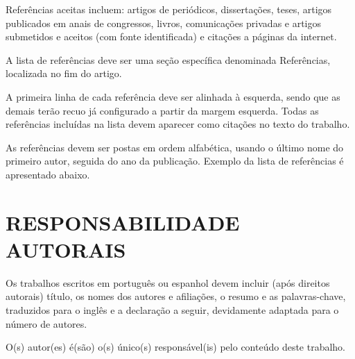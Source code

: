 \documentclass[10pt,fleqn,a4paper,twoside]{article}
\begin{document}
    
        Referências aceitas incluem: artigos de periódicos, dissertações, teses, artigos publicados em anais de congressos, livros, comunicações privadas e artigos submetidos e aceitos (com fonte identificada) e citações a páginas da internet.

        A lista de referências deve ser uma seção específica denominada Referências, localizada no fim do artigo.

        A primeira linha de cada referência deve ser alinhada à esquerda, sendo que as demais terão recuo já configurado a partir da margem esquerda. Todas as referências incluídas na lista devem aparecer como citações no texto do trabalho.

        As referências devem ser postas em ordem alfabética, usando o último nome do primeiro autor, seguida do ano da publicação. Exemplo da lista de referências é apresentado abaixo.
        
        
        

    \section{RESPONSABILIDADE AUTORAIS}

        Os trabalhos escritos em português ou espanhol devem incluir (após direitos autorais) título, os nomes dos autores e afiliações, o resumo e as palavras-chave, traduzidos para o inglês e a declaração a seguir, devidamente adaptada para o número de autores.
    
        O(s) autor(es) é(são) o(s) único(s) responsável(is) pelo conteúdo deste trabalho.

\end{document}
